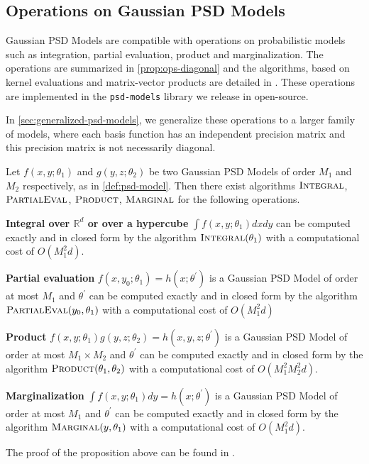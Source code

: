 
\subsection{Operations on Gaussian PSD Models}
Gaussian PSD Models are compatible with operations on probabilistic models such as integration, partial evaluation, product and marginalization. The operations are summarized in \cref{prop:ops-diagonal} and the algorithms, based on kernel evaluations and matrix-vector products are detailed in \cite{ciliberto2021}. These operations are implemented in the \texttt{psd-models} library we release in open-source.

In \cref{sec:generalized-psd-models}, we generalize these operations to a larger family of models, where each basis function has an independent precision matrix and this precision matrix is not necessarily diagonal.

\begin{proposition}\label{prop:ops-diagonal}
    Let $f(x, y; \theta_1)$ and $g(y, z; \theta_2)$ be two Gaussian PSD Models of order $M_1$ and $M_2$ respectively, as in \cref{def:psd-model}. Then there exist algorithms $\operatorname{\textsc{Integral}}$, $\operatorname{\textsc{PartialEval}}$, $\operatorname{\textsc{Product}}$, $\operatorname{\textsc{Marginal}}$ for the following operations.
    \begin{enumthm}
        \item \textbf{Integral over $\mathbb R^d$ or over a hypercube } $\int f(x, y; \theta_1)dxdy$ can be computed exactly and in closed form by the algorithm $\operatorname{\textsc{Integral}}(\theta_1)$ with a computational cost of $O(M_1^2 d)$.
        \item \textbf{Partial evaluation }$f(x, y_0; \theta_1) = h(x; \theta^\prime)$ is a Gaussian PSD Model of order at most $M_1$ and $\theta^\prime$ can be computed exactly and in closed form by the algorithm $\operatorname{\textsc{PartialEval}}(y_0, \theta_1)$ with a computational cost of $O(M_1^2 d)$
        \item \textbf{Product } $f(x, y; \theta_1)g(y, z; \theta_2)=h(x, y, z; \theta^\prime)$ is a Gaussian PSD Model of order at most $M_1\times M_2$ and $\theta^\prime$  can be computed exactly and in closed form by the algorithm $\operatorname{\textsc{Product}}(\theta_1, \theta_2)$ with a computational cost of $O(M_1^2 M_2^2 d)$.
        \item \textbf{Marginalization } $\int f(x, y; \theta_1)dy=h(x; \theta^\prime)$ is a Gaussian PSD Model of order at most $M_1$ and $\theta^\prime$ can be computed exactly and in closed form by the algorithm $\operatorname{\textsc{Marginal}}(y, \theta_1)$ with a computational cost of $O(M_1^2 d)$.
    \end{enumthm}
\end{proposition}
The proof of the proposition above can be found in \citep[Appendix F]{ciliberto2021}.

